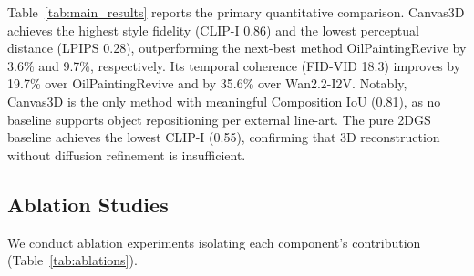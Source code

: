 Table~\ref{tab:main_results} reports the primary quantitative comparison.
Canvas3D achieves the highest style fidelity (CLIP-I 0.86) and the lowest
perceptual distance (LPIPS 0.28), outperforming the next-best method
OilPaintingRevive by 3.6\% and 9.7\%, respectively. Its temporal coherence
(FID-VID 18.3) improves by 19.7\% over OilPaintingRevive and by 35.6\% over
Wan2.2-I2V. Notably, Canvas3D is the only method with meaningful Composition
IoU (0.81), as no baseline supports object repositioning per external line-art.
The pure 2DGS baseline achieves the lowest CLIP-I (0.55), confirming that
3D reconstruction without diffusion refinement is insufficient.

\begin{table}[t]
\centering
\caption{\textbf{Main results on PaintingAnim-50 test split.}
Bold: best. ``--'' denotes metric inapplicable.}
\label{tab:main_results}
\end{table}

\subsection{Ablation Studies}

We conduct ablation experiments isolating each component's contribution
(Table~\ref{tab:ablations}).

